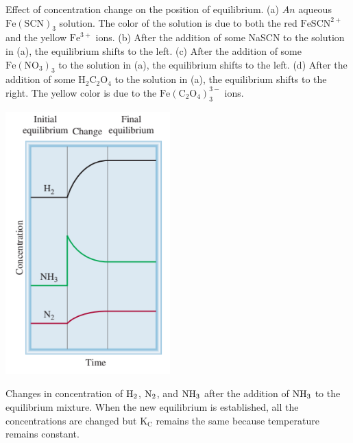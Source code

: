 \documentclass[a4paper,12pt,twocolumn]{article}
\begin{document}
Effect of concentration change on the position of equilibrium. (a) $A n$ aqueous $\mathrm{Fe}(\mathrm{SCN})_3$ solution. The color of the solution is due to both the red $\mathrm{FeSCN}^{2+}$ and the yellow $\mathrm{Fe}^{3+}$ ions. (b) After the addition of some NaSCN to the solution in (a), the equilibrium shifts to the left. (c) After the addition of some $\mathrm{Fe}\left(\mathrm{NO}_3\right)_3$ to the solution in (a), the equilibrium shifts to the left.
(d) After the addition of some $\mathrm{H}_2 \mathrm{C}_2 \mathrm{O}_4$ to the solution in (a), the equilibrium shifts to the right.
The yellow color is due to the $\mathrm{Fe}\left(\mathrm{C}_2 \mathrm{O}_4\right)_3^{3-}$ ions.
\begin{center}
    \includegraphics[width=2.5in, height=4in]{Screenshot 2023-03-23 001500.png}
\end{center}
Changes in 
concentration of $\ce{H2}$, $\ce{N2}$, and $\ce{NH3}$ after the addition of $\ce{NH3}$ to the equilibrium mixture. When the new equilibrium is established, all the concentrations are changed but $\mathrm{K_C}$ remains the same because temperature remains constant.
\end{document}
